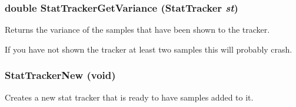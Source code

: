 \subsubsection{\setlength{\rightskip}{0pt plus 5cm}double Stat\-Tracker\-Get\-Variance ({\bf Stat\-Tracker} {\em st})}\label{stats_8h_a6}


Returns the variance of the samples that have been shown to the tracker. 

If you have not shown the tracker at least two samples this will probably crash. 
\subsubsection{ Stat\-Tracker\-New (void)}\label{stats_8h_a2}


Creates a new stat tracker that is ready to have samples added to it. 

